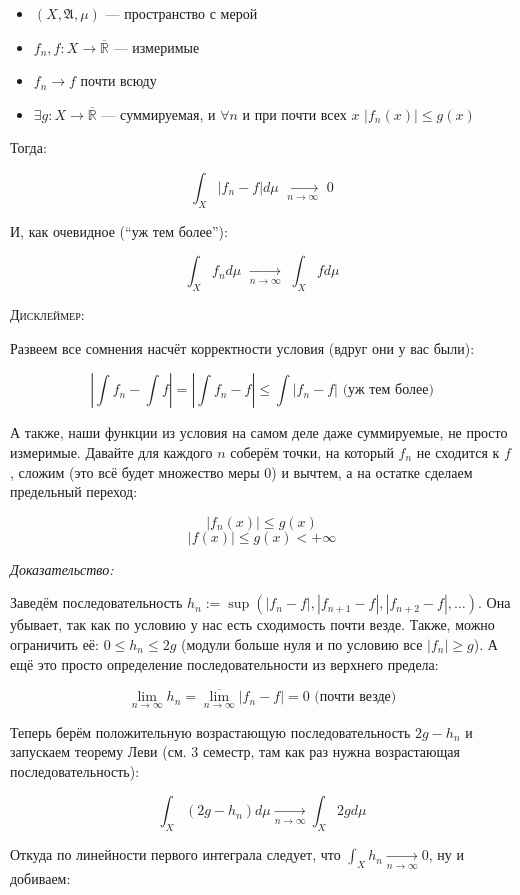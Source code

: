 \documentclass{article}
\def\dbl{\,\,}
\def\rinf{\overline{\mathbb{R}}}
\def\goesto#1{\underset{#1}{\longrightarrow}}
\def\toinf#1{\goesto{#1 \rightarrow \infty}}
\def\ntoinf{\toinf{n}}
\begin{document}
\begin{itemize}
    \item $(X, \mathfrak{A}, \mu)$ --- пространство с мерой
    \item $f_n, f: X \rightarrow \rinf$ --- измеримые
    \item $f_n \rightarrow f$ почти всюду
    \item $\exists g: X \rightarrow \rinf$ --- суммируемая, и $\forall n$ и при почти всех $x \dbl |f_n(x)| \le g(x)$
\end{itemize}

Тогда:

\[\int_{X}|f_n - f| d \mu \dbl \ntoinf \dbl 0\]

И, как очевидное (``уж тем более''):

\[\int_{X} f_n d\mu \dbl \ntoinf \dbl \int_{X} f d\mu\]


\textsc{Дисклеймер:}

Развеем все сомнения насчёт корректности условия (вдруг они у вас были):

\[\left| \int f_n - \int f \right| = \left| \int f_n - f \right| \le \int |f_n - f| \text{ (уж тем более)}\]

А также, наши функции из условия на самом деле даже суммируемые, не просто измеримые. Давайте для каждого $n$ соберём точки, на который $f_n$ не сходится к $f$, сложим (это всё будет множество меры 0) и вычтем, а на остатке сделаем предельный переход:

\[|f_n(x)| \le g(x)\]
\[|f(x)| \le g(x) < +\infty\]

\textit{Доказательство:}

Заведём последовательность $h_n := \sup (|f_n - f|, |f_{n + 1} - f|, |f_{n + 2} - f|, \ldots)$. Она убывает, так как по условию у нас есть сходимость почти везде. Также, можно ограничить её: $0 \le h_n \le 2 g$ (модули больше нуля и по условию все $|f_n| \ge g$). А ещё это просто определение последовательности из верхнего предела:

\[\lim_{n \rightarrow \infty} h_n = \overline{\lim_{n \rightarrow \infty}} |f_n - f| = 0 \text{ (почти везде)}\]

Теперь берём положительную возрастающую последовательность $2g - h_n$ и запускаем теорему Леви (см. 3 семестр, там как раз нужна возрастающая последовательность):

\[\int_{X} (2g - h_n) d\mu \ntoinf \int_{X} 2g d\mu\]

Откуда по линейности первого интеграла следует, что $\int_{X} h_n \ntoinf 0$, ну и добиваем:
\end{document}
